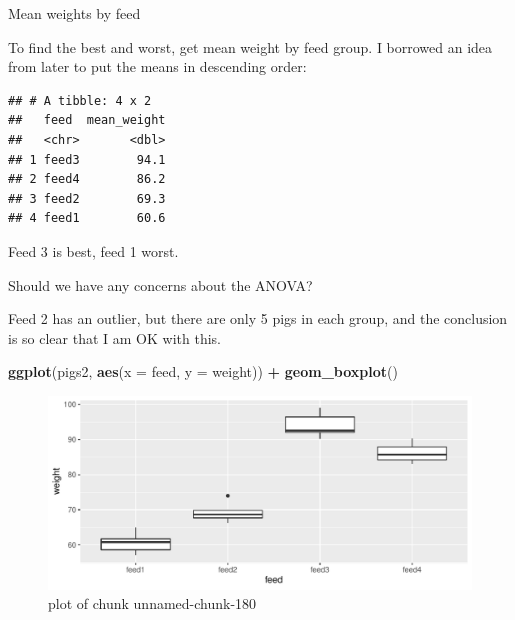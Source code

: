 \documentclass[ignorenonframetext,]{beamer}
\newenvironment{Shaded}{\begin{snugshade}}{\end{snugshade}}
\newcommand{\DataTypeTok}[1]{\textcolor[rgb]{0.13,0.29,0.53}{#1}}
\newcommand{\KeywordTok}[1]{\textcolor[rgb]{0.13,0.29,0.53}{\textbf{#1}}}
\newcommand{\NormalTok}[1]{#1}
\newcommand{\OperatorTok}[1]{\textcolor[rgb]{0.81,0.36,0.00}{\textbf{#1}}}
\newcommand{\StringTok}[1]{\textcolor[rgb]{0.31,0.60,0.02}{#1}}
\begin{document}
\begin{frame}[fragile]{Mean weights by feed}
\protect\hypertarget{mean-weights-by-feed}{}

To find the best and worst, get mean weight by feed group. I borrowed an
idea from later to put the means in descending order:

\begin{Shaded}
\end{Shaded}

\begin{verbatim}
## # A tibble: 4 x 2
##   feed  mean_weight
##   <chr>       <dbl>
## 1 feed3        94.1
## 2 feed4        86.2
## 3 feed2        69.3
## 4 feed1        60.6
\end{verbatim}

Feed 3 is best, feed 1 worst.

\end{frame}

\begin{frame}[fragile]{Should we have any concerns about the ANOVA?}
\protect\hypertarget{should-we-have-any-concerns-about-the-anova}{}

Feed 2 has an outlier, but there are only 5 pigs in each group, and the
conclusion is so clear that I am OK with this.

\begin{Shaded}
\begin{Highlighting}[]
\KeywordTok{ggplot}\NormalTok{(pigs2, }\KeywordTok{aes}\NormalTok{(}\DataTypeTok{x =}\NormalTok{ feed, }\DataTypeTok{y =}\NormalTok{ weight)) }\OperatorTok{+}\StringTok{ }\KeywordTok{geom_boxplot}\NormalTok{()}
\end{Highlighting}
\end{Shaded}

\begin{figure}
\centering
\includegraphics{figure/unnamed-chunk-180-1.pdf}
\caption{plot of chunk unnamed-chunk-180}
\end{figure}

\end{frame}
\end{document}
